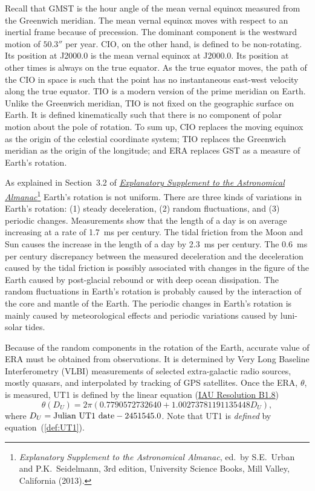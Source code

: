 \documentclass[12pt]{article}
\newcommand \beq {\begin{equation}}
\newcommand \eeq {\end{equation}}
\newcommand{\expl}{\href{http://www.uscibooks.com/urban.htm}{\it Explanatory Supplement to the Astronomical Almanac}}
\begin{document}
Recall that 
GMST is the hour angle of the mean vernal equinox measured from the Greenwich meridian. 
The mean vernal equinox moves with respect to an inertial frame because of precession. The 
dominant component is the westward motion of $50.3''$ per year. CIO, on the other hand, 
is defined to be non-rotating. Its position at J2000.0 is the mean vernal equinox at 
J2000.0. Its position at other times is always on the true equator.
As the true equator moves, the path of the CIO in space is such that 
the point has no instantaneous east-west velocity along the true equator. 
TIO is a modern version of the prime meridian on Earth. 
Unlike the Greenwich meridian, TIO is not fixed on the geographic surface on Earth. 
It is defined kinematically such that there is no component of polar motion about 
the pole of rotation. To sum up, CIO replaces the moving equinox as the origin 
of the celestial coordinate system; TIO replaces the Greenwich meridian as the origin 
of the longitude; and ERA replaces GST as a measure of Earth's rotation. 

As explained in Section~3.2 of \expl\footnote{{\it Explanatory Supplement 
to the Astronomical Almanac}, 
ed.\ by S.E.~Urban and P.K.~Seidelmann, 3rd edition, University Science Books, 
Mill Valley, California (2013).}
Earth's rotation is not uniform. There are three kinds of variations in Earth's rotation: 
(1) steady deceleration, (2) random fluctuations, and (3) periodic changes. Measurements 
show that the length of a day is on average increasing at a rate of 1.7~ms per century. 
The tidal friction from the Moon and Sun causes the increase in the length of a day by 
2.3~ms per century. The 0.6~ms per century discrepancy between the measured deceleration 
and the deceleration caused by the tidal friction is possibly associated with changes 
in the figure of the Earth caused by post-glacial rebound or with deep ocean 
dissipation. The random fluctuations in Earth's rotation is probably caused by 
the interaction of the core and mantle of the Earth. The periodic changes in 
Earth's rotation is mainly caused by meteorological effects and periodic variations 
caused by luni-solar tides. 

Because of the random components in the rotation of the Earth, accurate value of 
ERA must be obtained from observations. 
It is determined by Very Long Baseline Interferometry 
(VLBI) measurements of selected extra-galactic radio sources, 
mostly quasars, and interpolated by tracking of GPS satellites. Once the ERA, $\theta$, 
is measured, UT1 is defined by the linear equation 
(\href{http://www.iaufs.org/res.html#tabs-a6}{IAU Resolution B1.8})
\beq
  \theta(D_U) = 2\pi (0.7790572732640 + 1.00273781191135448 D_U) ,
\label{def:UT1}
\eeq
where $D_U = {\rm Julian~UT1~date} - 2451545.0$. Note that UT1 is {\em defined} by 
equation~(\ref{def:UT1}). 
\end{document}

